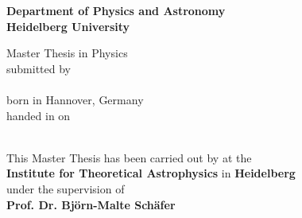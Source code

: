 \begin{titlepage}
\begin{center}
\makeatletter

\Large\textbf{Department of Physics and Astronomy\\
Heidelberg University}

\vfill

\normalsize
Master Thesis in Physics\\
\normalsize
submitted by\\[0.5cm]
\Large
\textbf{\@author}\\
\normalsize
born in Hannover, Germany\\[0.5cm]
\normalsize
handed in on\\
\Large
\textbf{\@date}\\[0.5cm]
\normalsize


\cleardoublepage
\thispagestyle{empty}


\LARGE\textbf{\@title}

\vfill

\normalsize
This Master Thesis has been carried out by \@author{} at the\\
\textbf{Institute for Theoretical Astrophysics} in \textbf{Heidelberg}\\
under the supervision of\\
\textbf{Prof. Dr. Björn-Malte Schäfer}

\makeatother
\end{center}
\end{titlepage}
